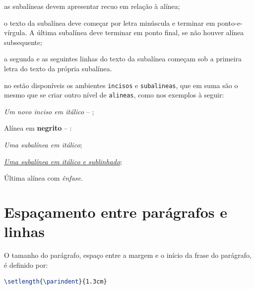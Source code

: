 \begin{alineas}
\begin{alineas}
        \item as subalíneas devem apresentar recuo em relação à alínea;

        \item o texto da subalínea deve começar por letra minúscula e terminar em
        ponto-e-vírgula. A última subalínea deve terminar em ponto final, se não
        houver alínea subsequente;

        \item a segunda e as seguintes linhas do texto da subalínea começam sob a
        primeira letra do texto da própria subalínea.
    \end{alineas}

    \item no \abnTeX{} estão disponíveis os ambientes \texttt{incisos} e
    \texttt{subalineas}, que em suma são o mesmo que se criar outro nível de
    \texttt{alineas}, como nos exemplos à seguir:

    \begin{incisos}
        \item \textit{Um novo inciso em itálico} -- \showfont;
    \end{incisos}

    \item Alínea em \textbf{negrito} -- \showfont:

    \begin{subalineas}
        \item \textit{Uma subalínea em itálico};
        \item \underline{\textit{Uma subalínea em itálico e sublinhado}};
    \end{subalineas}

    \item Última alínea com \emph{ênfase}.

\end{alineas}

\section{Espaçamento entre parágrafos e linhas}

O tamanho do parágrafo, espaço entre a margem
e o início da frase do parágrafo, é definido por:

\begin{lstlisting}[language=tex]
   \setlength{\parindent}{1.3cm}
\end{lstlisting}

